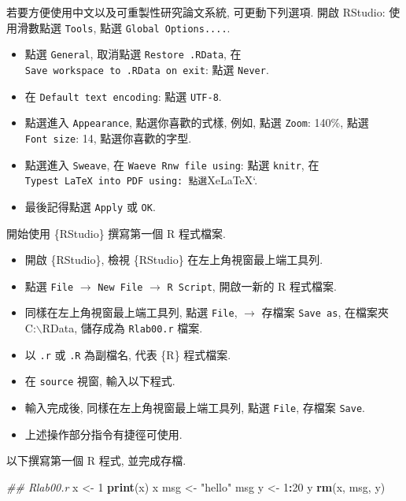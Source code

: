 \documentclass[
]{book}
\newenvironment{Shaded}{\begin{snugshade}}{\end{snugshade}}
\newcommand{\CommentTok}[1]{\textcolor[rgb]{0.56,0.35,0.01}{\textit{#1}}}
\newcommand{\DecValTok}[1]{\textcolor[rgb]{0.00,0.00,0.81}{#1}}
\newcommand{\KeywordTok}[1]{\textcolor[rgb]{0.13,0.29,0.53}{\textbf{#1}}}
\newcommand{\NormalTok}[1]{#1}
\newcommand{\OperatorTok}[1]{\textcolor[rgb]{0.81,0.36,0.00}{\textbf{#1}}}
\newcommand{\StringTok}[1]{\textcolor[rgb]{0.31,0.60,0.02}{#1}}
\providecommand{\tightlist}{%
  \setlength{\itemsep}{0pt}\setlength{\parskip}{0pt}}
\begin{document}
若要方便使用中文以及可重製性研究論文系統, 可更動下列選項.
開啟 RStudio:
使用滑數點選 \texttt{Tools}, 點選 \texttt{Global\ Options....}.

\begin{itemize}
\tightlist
\item
  點選 \texttt{General},
  取消點選 \texttt{Restore\ .RData},
  在 \texttt{Save\ workspace\ to\ .RData\ on\ exit}: 點選 \texttt{Never}.
\item
  在 \texttt{Default\ text\ encoding}: 點選 \texttt{UTF-8}.
\item
  點選進入 \texttt{Appearance},
  點選你喜歡的式樣, 例如,
  點選 \texttt{Zoom}: 140\%,
  點選 \texttt{Font\ size}: 14,
  點選你喜歡的字型.
\item
  點選進入 \texttt{Sweave},
  在 \texttt{Waeve\ Rnw\ file\ using}: 點選 \texttt{knitr},
  在 \texttt{Typest\ LaTeX\ into\ PDF\ using:\ 點選}XeLaTeX`.
\item
  最後記得點選 \texttt{Apply} 或 \texttt{OK}.
\end{itemize}

開始使用 \{RStudio\} 撰寫第一個 R 程式檔案.

\begin{itemize}
\tightlist
\item
  開啟 \{RStudio\}, 檢視 \{RStudio\} 在左上角視窗最上端工具列.
\item
  點選 \texttt{File} \(\rightarrow\) \texttt{New\ File} \(\rightarrow\) \texttt{R\ Script},
  開啟一新的 R 程式檔案.
\item
  同樣在左上角視窗最上端工具列,
  點選 \texttt{File},
  \(\rightarrow\) 存檔案 \texttt{Save\ as},
  在檔案夾 C:\(\backslash\)RData,
  儲存成為 \texttt{Rlab00.r} 檔案.
\item
  以 \texttt{.r} 或 \texttt{.R} 為副檔名, 代表 \{R\} 程式檔案.
\item
  在 \texttt{source} 視窗, 輸入以下程式.
\item
  輸入完成後, 同樣在左上角視窗最上端工具列,
  點選 \texttt{File},
  存檔案 \texttt{Save}.
\item
  上述操作部分指令有捷徑可使用.
\end{itemize}

以下撰寫第一個 R 程式, 並完成存檔.

\begin{Shaded}
\begin{Highlighting}[]
\CommentTok{\#\# Rlab00.r}
\NormalTok{x \textless{}{-}}\StringTok{ }\DecValTok{1}
\KeywordTok{print}\NormalTok{(x)}
\NormalTok{x}
\NormalTok{msg \textless{}{-}}\StringTok{ "hello"}
\NormalTok{msg}
\NormalTok{y \textless{}{-}}\StringTok{ }\DecValTok{1}\OperatorTok{:}\DecValTok{20}
\NormalTok{y}
\KeywordTok{rm}\NormalTok{(x, msg, y)}
\end{Highlighting}
\end{Shaded}
\end{document}
